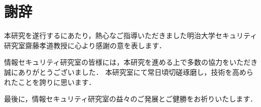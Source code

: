 \newpage
\section*{謝辞}
本研究を遂行するにあたり，熱心なご指導いただきました明治大学セキュリティ研究室齋藤孝道教授に心より感謝の意を表します．

情報セキュリティ研究室の皆様には，本研究を進める上で多数の協力をいただき誠にありがとうございました．
本研究室にて常日頃切磋琢磨し，技術を高められたことを誇りに思います．

最後に，情報セキュリティ研究室の益々のご発展とご健勝をお祈りいたします．
